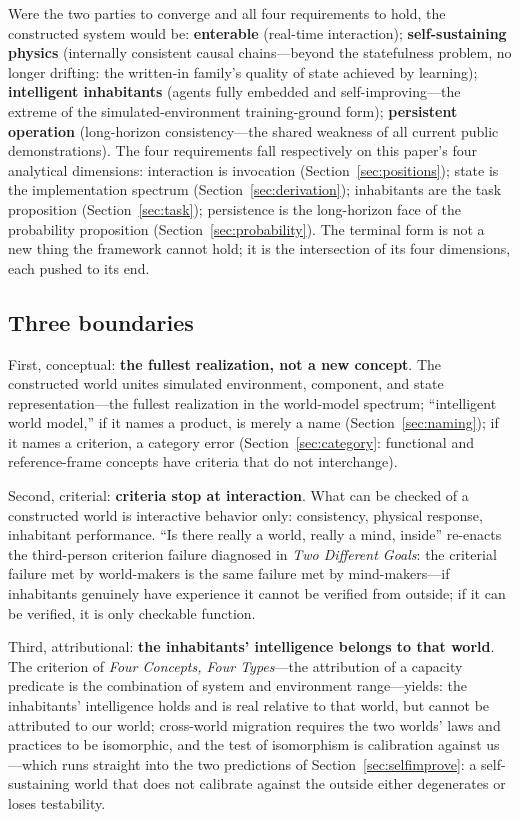 \documentclass[10pt]{article}
\begin{document}
Were the two parties to converge and all four requirements to hold, the constructed system would be: \textbf{enterable} (real-time interaction); \textbf{self-sustaining physics} (internally consistent causal chains---beyond the statefulness problem, no longer drifting: the written-in family's quality of state achieved by learning); \textbf{intelligent inhabitants} (agents fully embedded and self-improving---the extreme of the simulated-environment training-ground form); \textbf{persistent operation} (long-horizon consistency---the shared weakness of all current public demonstrations\cite{deepmind2026genie4}). The four requirements fall respectively on this paper's four analytical dimensions: interaction is invocation (Section~\ref{sec:positions}); state is the implementation spectrum (Section~\ref{sec:derivation}); inhabitants are the task proposition (Section~\ref{sec:task}); persistence is the long-horizon face of the probability proposition (Section~\ref{sec:probability}). The terminal form is not a new thing the framework cannot hold; it is the intersection of its four dimensions, each pushed to its end.

\subsection{Three boundaries}\label{sec:boundaries}

First, conceptual: \textbf{the fullest realization, not a new concept}. The constructed world unites simulated environment, component, and state representation---the fullest realization in the world-model spectrum; ``intelligent world model,'' if it names a product, is merely a name (Section~\ref{sec:naming}); if it names a criterion, a category error (Section~\ref{sec:category}: functional and reference-frame concepts have criteria that do not interchange).

Second, criterial: \textbf{criteria stop at interaction}. What can be checked of a constructed world is interactive behavior only: consistency, physical response, inhabitant performance. ``Is there really a world, really a mind, inside'' re-enacts the third-person criterion failure diagnosed in \emph{Two Different Goals}\cite{yu2026twogoals}: the criterial failure met by world-makers is the same failure met by mind-makers---if inhabitants genuinely have experience it cannot be verified from outside; if it can be verified, it is only checkable function.

Third, attributional: \textbf{the inhabitants' intelligence belongs to that world}. The criterion of \emph{Four Concepts, Four Types}\cite{yu2026fourconcepts}---the attribution of a capacity predicate is the combination of system and environment range---yields: the inhabitants' intelligence holds and is real relative to that world, but cannot be attributed to our world; cross-world migration requires the two worlds' laws and practices to be isomorphic, and the test of isomorphism is calibration against us---which runs straight into the two predictions of Section~\ref{sec:selfimprove}: a self-sustaining world that does not calibrate against the outside either degenerates or loses testability.
\end{document}
